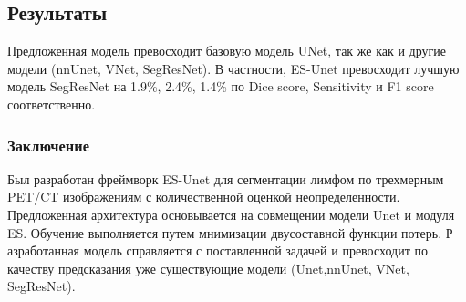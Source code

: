 \subsection*{Результаты} 
\par
Предложенная модель превосходит базовую модель UNet\cite{Unet}, так же как и другие модели (nnUnet, VNet, SegResNet). 
В частности, ES-Unet превосходит лучшую модель SegResNet на 1.9\%, 2.4\%, 1.4\% по Dice score, Sensitivity и F1 score соответственно.
\subsubsection*{Заключение}
Был разработан фреймворк ES-Unet для сегментации лимфом по трехмерным PET/CT изображениям с 
количественной оценкой неопределенности. Предложенная архитектура основывается на совмещении 
модели Unet и модуля ES. Обучение выполняется путем мнимизации двусоставной функции потерь. Р
азработанная модель справляется с поставленной задачей и превосходит по качеству предсказания 
уже существующие модели (Unet,nnUnet, VNet, SegResNet).